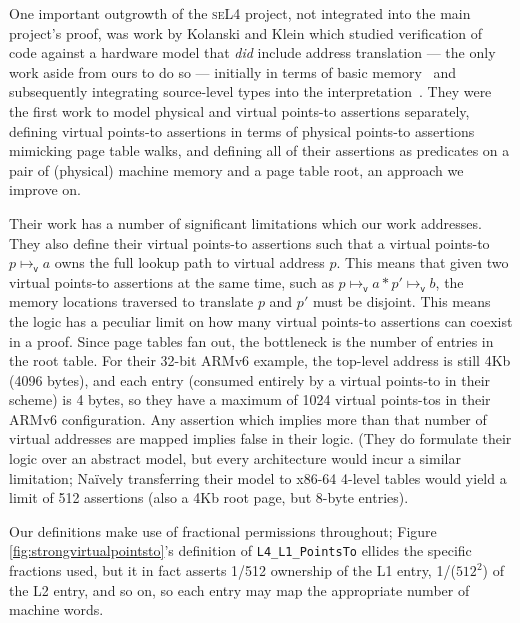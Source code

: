 One important outgrowth of the \textsc{seL4} project, not integrated into the main project's proof, was work by 
Kolanski and Klein which studied verification of code against a hardware model that \emph{did} include address translation
 --- the only work aside from ours to do so --- initially in terms of basic memory~\cite{kolanski08vstte} and subsequently 
integrating source-level types into the interpretation~\cite{kolanski09tphols}. 
They were the first work to model physical and virtual points-to assertions separately, defining virtual points-to assertions
in terms of physical points-to assertions mimicking page table walks, and defining all of their assertions as predicates on a
pair of (physical) machine memory and a page table root, an approach we improve on.

Their work has a number of significant limitations which our work addresses.
They also define their virtual points-to assertions such that a virtual points-to $p\mapsto_\mathsf{v} a$ owns the full 
lookup path to virtual address $p$. This means that given two virtual points-to assertions at the same time, such as 
$p\mapsto_\mathsf{v}a \ast p'\mapsto_\mathsf{v}b$, the memory locations traversed to translate $p$ and $p'$ must be disjoint. 
This means the logic has a peculiar limit on how many virtual points-to assertions can coexist in a proof. Since page tables 
fan out, the bottleneck is the number of entries in the root table. For their 32-bit ARMv6 example, the top-level address is 
still 4Kb (4096 bytes), and each entry (consumed entirely by a virtual points-to in their scheme) is 4 bytes, so they have a 
maximum of 1024 virtual points-tos in their ARMv6 configuration. Any assertion which implies more than that number
of virtual addresses are mapped implies false in their logic.
(They do formulate their logic over an abstract model, but every architecture would incur a similar limitation;
Na\"ively transferring their model to x86-64 4-level tables would yield a limit of 512 assertions (also a 4Kb root page, 
but 8-byte entries).

Our definitions make use of fractional permissions throughout; Figure \ref{fig:strongvirtualpointsto}'s definition
of \lstinline|L4_L1_PointsTo| ellides the specific fractions used, but it in fact asserts 1/512 ownership of
the L1 entry, 1/($512^2$) of the L2 entry, and so on, so each entry may map the appropriate number of machine words.

